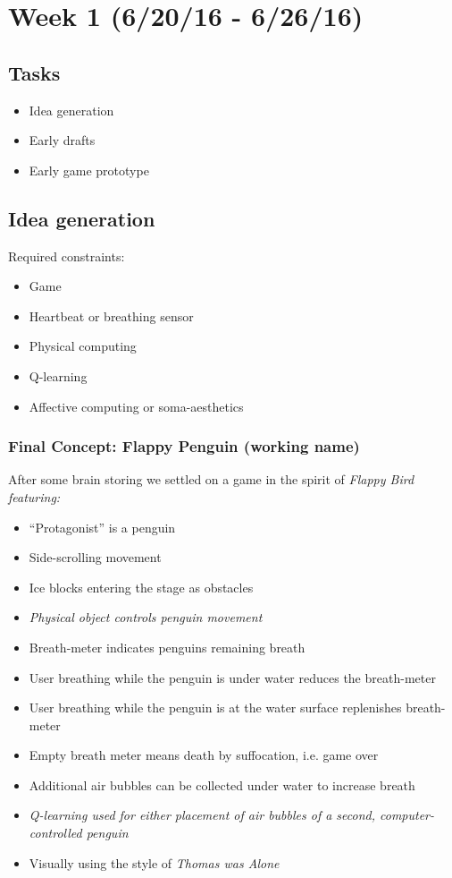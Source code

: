 \documentclass{article}
\begin{document}
\section{Week 1 (6/20/16 - 6/26/16)}
    \subsection{Tasks}
    \begin{itemize}
        \item Idea generation
        \item Early drafts
        \item Early game prototype
    \end{itemize}

    \subsection{Idea generation}
        Required constraints:
        \begin{itemize}
            \item Game
            \item Heartbeat or breathing sensor
            \item Physical computing
            \item Q-learning
            \item Affective computing or soma-aesthetics
        \end{itemize}

        \subsubsection{Final Concept: Flappy Penguin (working name)}
            After some brain storing we settled on a game in the spirit of \em Flappy Bird \em featuring:
            \begin{itemize}
                \item ``Protagonist'' is a penguin
                \item Side-scrolling movement
                \item Ice blocks entering the stage as obstacles
                \item \em Physical object \em controls penguin movement
                \item Breath-meter indicates penguins remaining breath
                \item User breathing while the penguin is under water reduces the breath-meter
                \item User breathing while the penguin is at the water surface replenishes breath-meter
                \item Empty breath meter means death by suffocation, i.e. game over
                \item Additional air bubbles can be collected under water to increase breath
                \item \em Q-learning \em used for either placement of air bubbles of a second, computer-controlled penguin
                \item Visually using the style of \em Thomas was Alone \em
            \end{itemize}
\end{document}

